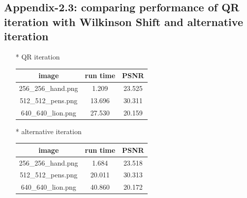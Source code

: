 \subsection{Appendix-2.3: comparing performance of QR iteration with Wilkinson Shift and alternative iteration}
\begin{enumerate}
\item[*] QR iteration 
\begin{table}[H]
    \centering
    \begin{tabular}{|c|c|c|}
        \hline
        \textbf{image} & \textbf{run time} & \textbf{PSNR} \\
        \hline
        256_256_hand.png & 1.209 & 23.525 \\
        \hline
        512_512_pens.png & 13.696 & 30.311 \\
        \hline
        640_640_lion.png & 27.530 & 20.159 \\
        \hline
    \end{tabular}
\end{table}
\item[*] alternative iteration
\begin{table}[H]
    \centering
    \begin{tabular}{|c|c|c|}
        \hline
        \textbf{image} & \textbf{run time} & \textbf{PSNR} \\
        \hline
        256_256_hand.png & 1.684 & 23.518 \\
        \hline
        512_512_pens.png & 20.011 & 30.313 \\
        \hline
        640_640_lion.png & 40.860 & 20.172 \\
        \hline
    \end{tabular}
\end{table}
\end{enumerate}




